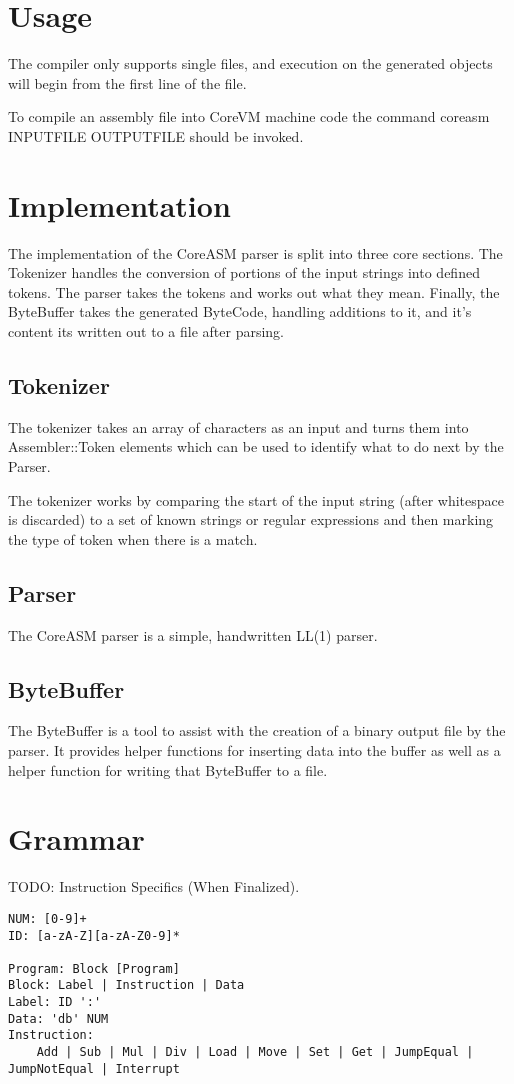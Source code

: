 \documentclass{article}
\begin{document}
\section* {Usage}

The compiler only supports single files, and execution on the generated objects will begin from the first line of the file.

To compile an assembly file into CoreVM machine code the command coreasm INPUTFILE OUTPUTFILE should be invoked.

\section* {Implementation}

The implementation of the CoreASM parser is split into three core sections. The Tokenizer handles the conversion of portions of the input strings into defined tokens.
The parser takes the tokens and works out what they mean. Finally, the ByteBuffer takes the generated ByteCode, handling additions to it, and it's content its written
out to a file after parsing.

\subsection* {Tokenizer}

The tokenizer takes an array of characters as an input and turns them into Assembler::Token elements which can be used to identify what to do next by the Parser.

The tokenizer works by comparing the start of the input string (after whitespace is discarded) to a set of known strings or regular expressions and then marking the type of token when there is a match.

\subsection* {Parser}

The CoreASM parser is a simple, handwritten LL(1) parser. 

\subsection* {ByteBuffer}

The ByteBuffer is a tool to assist with the creation of a binary output file by the parser. It provides helper functions for inserting data into the buffer as well as a helper function for writing that ByteBuffer to a file.

\section* {Grammar}
TODO: Instruction Specifics (When Finalized).
\begin{verbatim}
NUM: [0-9]+
ID: [a-zA-Z][a-zA-Z0-9]*

Program: Block [Program]
Block: Label | Instruction | Data
Label: ID ':'
Data: 'db' NUM
Instruction:
	Add | Sub | Mul | Div | Load | Move | Set | Get | JumpEqual | JumpNotEqual | Interrupt
\end{verbatim}
\end{document}
